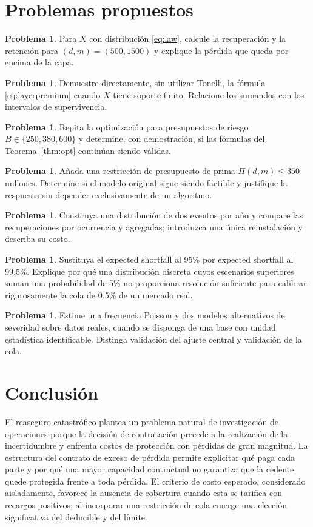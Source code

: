 \documentclass[11pt,reqno]{amsart}
\theoremstyle{definition}\newtheorem{definition}[theorem]{Definición}
\newtheorem{exercise}[theorem]{Problema}
\theoremstyle{remark}\newtheorem{remark}[theorem]{Observación}
\begin{document}
\section{Problemas propuestos}
\begin{exercise}
Para $X$ con distribución \eqref{eq:law}, calcule la recuperación y la retención para $(d,m)=(500,1500)$ y explique la pérdida que queda por encima de la capa.
\end{exercise}
\begin{exercise}
Demuestre directamente, sin utilizar Tonelli, la fórmula \eqref{eq:layerpremium} cuando $X$ tiene soporte finito. Relacione los sumandos con los intervalos de supervivencia.
\end{exercise}
\begin{exercise}
Repita la optimización para presupuestos de riesgo $B\in\{250,380,600\}$ y determine, con demostración, si las fórmulas del Teorema~\ref{thm:opt} continúan siendo válidas.
\end{exercise}
\begin{exercise}
Añada una restricción de presupuesto de prima $\Pi(d,m)\le350$ millones. Determine si el modelo original sigue siendo factible y justifique la respuesta sin depender exclusivamente de un algoritmo.
\end{exercise}
\begin{exercise}
Construya una distribución de dos eventos por año y compare las recuperaciones por ocurrencia y agregadas; introduzca una única reinstalación y describa su costo.
\end{exercise}
\begin{exercise}
Sustituya el expected shortfall al 95\% por expected shortfall al 99.5\%. Explique por qué una distribución discreta cuyos escenarios superiores suman una probabilidad de 5\% no proporciona resolución suficiente para calibrar rigurosamente la cola de 0.5\% de un mercado real.
\end{exercise}
\begin{exercise}
Estime una frecuencia Poisson y dos modelos alternativos de severidad sobre datos reales, cuando se disponga de una base con unidad estadística identificable. Distinga validación del ajuste central y validación de la cola.
\end{exercise}

\section{Conclusión}
El reaseguro catastrófico plantea un problema natural de investigación de operaciones porque la decisión de contratación precede a la realización de la incertidumbre y enfrenta costos de protección con pérdidas de gran magnitud. La estructura del contrato de exceso de pérdida permite explicitar qué paga cada parte y por qué una mayor capacidad contractual no garantiza que la cedente quede protegida frente a toda pérdida. El criterio de costo esperado, considerado aisladamente, favorece la ausencia de cobertura cuando esta se tarifica con recargos positivos; al incorporar una restricción de cola emerge una elección significativa del deducible y del límite.
\end{document}
